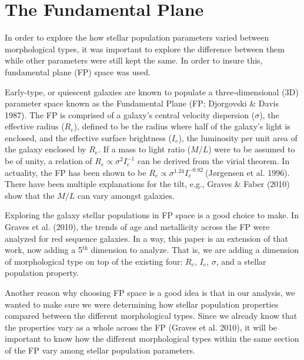 \documentclass[showcase, preprintnumbers, amsmath, amssymb, bibnotes, 12pt]{revtex4}
\begin{document}
\section{The Fundamental Plane}

In order to explore the how stellar population parameters varied between morphological types, it was important to explore the difference between them while other parameters were still kept the same. In order to insure this, fundamental plane (FP) space was used. %

Early-type, or quiescent galaxies are known to populate a three-dimensional (3D) parameter space known as the Fundamental Plane (FP; Djorgovski \& Davis 1987). The FP is comprised of a galaxy's central velocity dispersion ($\sigma$), the effective radius ($R_e$), defined to be the radius where half of the galaxy's light is enclosed, and the effective surface brightness ($I_e$), the luminosity per unit area of the galaxy enclosed by $R_e$. If a mass to light ratio ($M/L$) were to be assumed to be of unity, a relation of $R_e \propto \sigma^2I_e^{-1}$ can be derived from the virial theorem. In actuality, the FP has been shown to be $R_e \propto \sigma^{1.24}I_e^{-0.82}\ $(J\o rgensen et al. 1996). There have been multiple explanations for the tilt, e.g., Graves \& Faber (2010) show that the $M/L$ can vary amongst galaxies. 

Exploring the galaxy stellar populations in FP space is a good choice to make. In Graves et al. (2010), the trends of age and metallicity across the FP were analyzed for red sequence galaxies. In a way, this paper is an extension of that work, now adding a 5$^{\text{th}}$ dimension to analyze. That is, we are adding a dimension of morphological type on top of the existing four: $R_e$, $I_e$, $\sigma$, and a stellar population property.

Another reason why choosing FP space is a good idea is that in our analysis, we wanted to make sure we were determining how stellar population properties compared between the different morphological types. Since we already know that the properties vary as a whole across the FP (Graves et al. 2010), it will be important to know how the different morphological types within the same section of the FP vary among stellar population parameters. 
\end{document}
